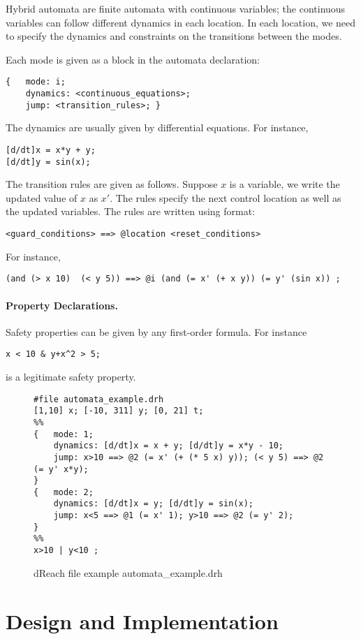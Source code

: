 \documentclass[envcountsect]{llncs}
\begin{document}
Hybrid automata are finite automata with continuous variables; the continuous
variables can follow different dynamics in each location. In each location, we
need to specify the dynamics and constraints on the transitions between the
modes. 

Each mode is given as a block in the automata declaration:
\begin{verbatim}
{  	mode: i;
    dynamics: <continuous_equations>;
    jump: <transition_rules>; }
\end{verbatim}
The dynamics are usually given by differential equations. For instance,
\begin{verbatim}
[d/dt]x = x*y + y;
[d/dt]y = sin(x);
\end{verbatim}
The transition rules are given as follows. Suppose $x$ is a variable, we write
the updated value of $x$ as $x'$. The rules specify the next control location as
well as the updated variables. The rules are written using format:
\begin{verbatim}
<guard_conditions> ==> @location <reset_conditions>
\end{verbatim}
For instance,
\begin{verbatim}
(and (> x 10)  (< y 5)) ==> @i (and (= x' (+ x y)) (= y' (sin x)) ; 
\end{verbatim}

\paragraph{Property Declarations.}

Safety properties can be given by any first-order formula. For instance
\begin{verbatim}
x < 10 & y+x^2 > 5;
\end{verbatim}
is a legitimate safety property. 
\begin{figure}[h!]
\label{dreach}
\begin{verbatim}
#file automata_example.drh
[1,10] x; [-10, 311] y; [0, 21] t;
%%
{   mode: 1;
    dynamics: [d/dt]x = x + y; [d/dt]y = x*y - 10;
    jump: x>10 ==> @2 (= x' (+ (* 5 x) y)); (< y 5) ==> @2 (= y' x*y);
}
{   mode: 2;
    dynamics: [d/dt]x = y; [d/dt]y = sin(x);
    jump: x<5 ==> @1 (= x' 1); y>10 ==> @2 (= y' 2);
}    
%%
x>10 | y<10 ;
\end{verbatim}
\caption{dReach file example automata\_example.drh}
\end{figure}

\section{Design and Implementation}
\end{document}
